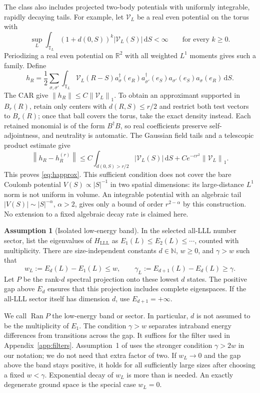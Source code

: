 \documentclass[11pt]{article}
\theoremstyle{definition}
\newtheorem{assumption}[theorem]{Assumption}
\theoremstyle{remark}
\newcommand{\dd}{\,\mathrm d}
\newcommand{\Ran}{\operatorname{Ran}}
\newcommand{\TT}{\mathbb T}
\newcommand{\norm}[1]{\left\lVert#1\right\rVert}
\begin{document}
The class also includes projected two-body potentials with uniformly
integrable, rapidly decaying tails.  For example, let \(\mathcal V_L\) be a
real even potential on the torus with
\[
 \sup_L\int_{\TT_L}(1+d(0,S))^k|\mathcal V_L(S)|\dd S<\infty
 \qquad\text{for every }k\ge0.
\]
Periodizing a real even potential on \(\mathbb R^2\) with all
weighted \(L^1\) moments gives such a family.  Define
\[
 h_R=\frac12\sum_{\sigma,\sigma'}\int_{\TT_L}\mathcal V_L(R-S)
 a_\sigma^\dagger(e_R)a_{\sigma'}^\dagger(e_S)
 a_{\sigma'}(e_S)a_\sigma(e_R)\dd S.
\]
The CAR give \(\norm{h_R}\le C\norm{\mathcal V_L}_1\).  To obtain an
approximant supported in \(B_r(R)\), retain only centers with
\(d(R,S)\le r/2\) and restrict both test vectors to \(B_r(R)\);
once that ball covers the torus, take the exact density instead.
Each retained monomial is of the form \(B^\dagger B\), so real
coefficients preserve self-adjointness, and neutrality is automatic.
The Gaussian field tails and a telescopic product estimate give
\[
 \norm{h_R-h_R^{(r)}}\le
 C\int_{d(0,S)>r/2}|\mathcal V_L(S)|\dd S
       +Ce^{-cr^2}\norm{\mathcal V_L}_1.
\]
This proves \eqref{eq:happrox}.  This sufficient condition does not
cover the bare Coulomb potential \(V(S)\propto |S|^{-1}\) in two
spatial dimensions: its large-distance \(L^1\) norm is not uniform
in volume.  An integrable potential with
an algebraic tail \(|V(S)|\sim |S|^{-\alpha}\), \(\alpha>2\),
gives only a bound of order \(r^{2-\alpha}\) by this construction.
No extension to a fixed algebraic decay rate is claimed here.

\begin{assumption}[Isolated low-energy band]\label{ass:band}
In the selected all-LLL number sector, list the eigenvalues of
\(H_{\mathrm{LLL}}\) as \(E_1(L)\le E_2(L)\le\cdots\), counted
with multiplicity.  There are size-independent constants
\(d\in\mathbb N\), \(w\ge0\), and \(\gamma>w\) such that
\begin{equation}\label{eq:bandhypothesis}
 w_L:=E_d(L)-E_1(L)\le w,\qquad
 \gamma_L:=E_{d+1}(L)-E_d(L)\ge\gamma.
\end{equation}
Let \(P\) be the rank-\(d\) spectral projection onto these lowest
\(d\) states.  The positive gap above \(E_d\) ensures that this
projection includes complete eigenspaces.  If the all-LLL sector
itself has dimension \(d\), use \(E_{d+1}=+\infty\).
\end{assumption}

We call \(\Ran P\) the low-energy band or sector.  In particular,
\(d\) is not assumed to be the multiplicity of \(E_1\).
The condition \(\gamma>w\) separates intraband energy differences
from transitions across the gap.  It suffices for the filter used
in Appendix~\ref{app:filters}.  Assumption~1 of \cite{BBDF21}
uses the stronger condition \(\gamma>2w\) in our notation;
we do not need that extra factor of two.  If \(w_L\to0\) and the gap above the band stays
positive, it holds for all sufficiently large sizes after choosing
a fixed \(w<\gamma\).  Exponential decay of \(w_L\) is more
than is needed.  An exactly degenerate ground space is the special
case \(w_L=0\).
\end{document}
